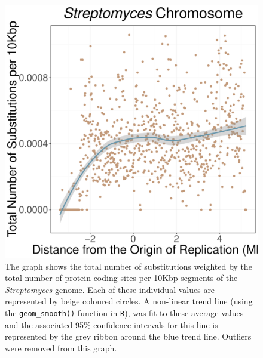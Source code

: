 \documentclass[11pt]{article}
\newcommand{\strep}{\textit{Streptomyces}\xspace}
\begin{document}
\begin{figure}[h]
	\begin{center}
		\includegraphics[width=\textwidth]{./figs/strep_10KB_weighted_subs_nonpar_10Nov20.pdf}
		\caption{\label{fig:strep_nonpar}The graph shows the total number of substitutions weighted by the total number of protein-coding sites per 10Kbp segments of the \strep genome. Each of these individual values are represented by beige coloured circles. A non-linear trend line (using the \texttt{geom\_smooth()} function in \texttt{R}), was fit to these average values and the associated 95\% confidence intervals for this line is represented by the grey ribbon around the blue trend line. Outliers were removed from this graph.}
	\end{center}
\end{figure}
\end{document}
